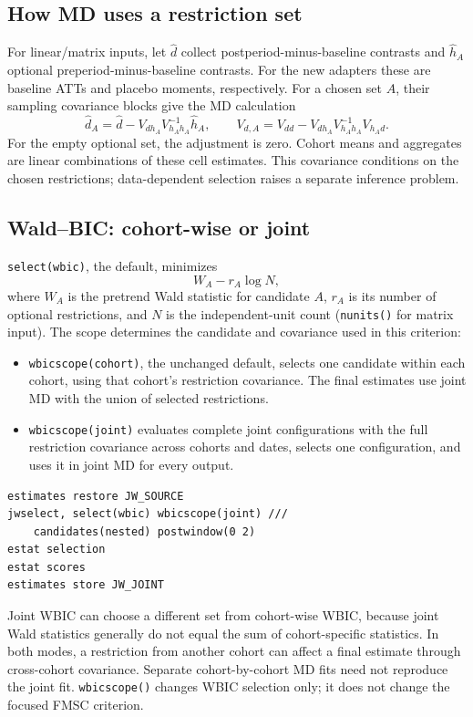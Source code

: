\documentclass[11pt]{article}
\newcommand{\cmd}[1]{\texttt{#1}}
\begin{document}
\subsection{How MD uses a restriction set}
For linear/matrix inputs, let $\widehat d$ collect postperiod-minus-baseline
contrasts and $\widehat h_A$ optional preperiod-minus-baseline contrasts.
For the new adapters these are baseline ATTs and placebo moments, respectively.
For a chosen set $A$, their sampling covariance blocks give the MD calculation
\[
 \widehat d_A=\widehat d-V_{dh_A}V_{h_Ah_A}^{-1}\widehat h_A,
 \qquad V_{d,A}=V_{dd}-V_{dh_A}V_{h_Ah_A}^{-1}V_{h_Ad}.
\]
For the empty optional set, the adjustment is zero. Cohort means and
aggregates are linear combinations of these cell estimates. This covariance
conditions on the chosen restrictions; data-dependent selection raises a
separate inference problem.

\subsection{Wald--BIC: cohort-wise or joint}
\cmd{select(wbic)}, the default, minimizes
\[
   W_A-r_A\log N,
\]
where $W_A$ is the pretrend Wald statistic for candidate $A$, $r_A$ is its
number of optional restrictions, and $N$ is the independent-unit count
(\cmd{nunits()} for matrix input). The scope determines the candidate and
covariance used in this criterion:
\begin{itemize}
\item \cmd{wbicscope(cohort)}, the unchanged default, selects one candidate
within each cohort, using that cohort's restriction covariance. The final
estimates use joint MD with the union of selected restrictions.
\item \cmd{wbicscope(joint)} evaluates complete joint configurations with
the full restriction covariance across cohorts and dates, selects one
configuration, and uses it in joint MD for every output.
\end{itemize}
\begin{lstlisting}
estimates restore JW_SOURCE
jwselect, select(wbic) wbicscope(joint) ///
    candidates(nested) postwindow(0 2)
estat selection
estat scores
estimates store JW_JOINT
\end{lstlisting}
Joint WBIC can choose a different set from cohort-wise WBIC, because joint
Wald statistics generally do not equal the sum of cohort-specific statistics.
In both modes, a restriction from another cohort can affect a final estimate
through cross-cohort covariance. Separate cohort-by-cohort MD fits need not
reproduce the joint fit. \cmd{wbicscope()} changes WBIC selection only;
it does not change the focused FMSC criterion.
\end{document}
